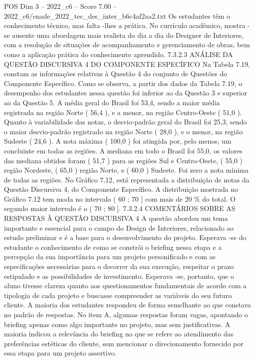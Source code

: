 \begin{textsample}{POS Dim 3 – 2022\_c6 – Score 7.00 – 2022\_c6/enade\_2022\_tec\_des\_inter\_b6c4af2aa2.txt}
Os estudantes têm o conhecimento técnico, mas falta -lhes a prática.
No currículo acadêmico, mostra -se ausente uma abordagem mais realista do dia a dia do Designer de Interiores, com a resolução de situações de acompanhamento e gerenciamento de obras, bem como a aplicação prática do conhecimento aprendido. 7.3.2.3 ANÁLISE DA QUESTÃO DISCURSIVA 4 DO COMPONENTE ESPECÍFICO Na Tabela 7.19, constam as informações relativas à Questão 4 do conjunto de Questões do Componente Específico.
Como se observa, a partir dos dados da Tabela 7.19, o desempenho dos estudantes nessa questão foi inferior ao da Questão 3 e superior ao da Questão 5.
A média geral do Brasil foi 53,4, sendo a maior média registrada na região Norte ( 56,4 ), e a menor, na região Centro-Oeste ( 51,0 ).
Quanto à variabilidade das notas, o desvio-padrão geral do Brasil foi 25,3, sendo o maior desvio-padrão registrado na região Norte ( 28,0 ), e o menor, na região Sudeste ( 24,6 ).
A nota máxima ( 100,0 ) foi atingida por, pelo menos, um concluinte em todas as regiões.
A mediana em todo o Brasil foi 55,0, os valores das mediana obtidos foram ( 51,7 ) para as regiões Sul e Centro-Oeste, ( 55,0 ) região Nordeste, ( 65,0 ) região Norte, e ( 60,0 ) Sudeste.
Foi zero a nota mínima de todas as regiões.
No Gráfico 7.12, está representada a distribuição de notas da Questão Discursiva 4, do Componente Específico.
A distribuição mostrada no Gráfico 7.12 tem moda no intervalo ( 60 ; 70 ] com mais de 20 \% do total.
O segundo maior intervalo é o ( 70 ; 80 ]. 7.3.2.4 COMENTÁRIOS SOBRE AS RESPOSTAS À QUESTÃO DISCURSIVA 4 A questão abordou um tema importante e essencial para o campo do Design de Interiores, relacionado ao estudo preliminar e é a base para o desenvolvimento do projeto.
Esperava -se do estudante o conhecimento de como se constrói o briefing nessa etapa e a percepção da sua importância para um projeto personificado e com as especificações necessárias para o decorrer da sua execução, respeitar o prazo estipulado e as possibilidades de investimento.
Esperava -se, portanto, que o aluno tivesse clareza quanto aos questionamentos fundamentais de acordo com a tipologia de cada projeto e buscasse compreender as variáveis do seu futuro cliente.
A maioria dos estudantes respondeu de forma semelhante ao que constava no padrão de respostas.
No item A, algumas respostas foram vagas, apontando o briefing apenas como algo importante no projeto, mas sem justificativas.
A maioria indicou a relevância do briefing no que se refere ao atendimento das preferências estéticas do cliente, sem mencionar o direcionamento fornecido por essa etapa para um projeto assertivo.

\end{textsample}
